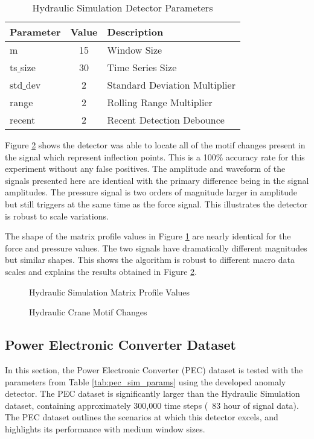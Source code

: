 \begin{table}[H]
\caption{Hydraulic Simulation Detector Parameters}
\begin{tabular}{|l|c|l|}
    \hline
	\textbf{Parameter} & \textbf{Value} & \textbf{Description} \\ \hline
	m & 15 & Window Size \\ \hline
	ts$\_$size & 30 & Time Series Size \\ \hline
	std$\_$dev & 2 & Standard Deviation Multiplier \\ \hline
	range & 2 & Rolling Range Multiplier\\ \hline
	recent & 2 & Recent Detection Debounce\\ \hline
\end{tabular}
\label{tab:hydraulic_sim_params}
\end{table}

Figure \ref{fig:hydraulic_result_fp} shows the detector was able to locate all of the motif changes present in the signal which represent inflection points.
This is a 100\% accuracy rate for this experiment without any false positives.
The amplitude and waveform of the signals presented here are identical with the primary difference being in the signal amplitudes.
The pressure signal is two orders of magnitude larger in amplitude but still triggers at the same time as the force signal.
This illustrates the detector is robust to scale variations.

The shape of the matrix profile values in Figure \ref{fig:hydraulic_mp_hist_fp} are nearly identical for the force and pressure values.
The two signals have dramatically different magnitudes but similar shapes.
This shows the algorithm is robust to different macro data scales and explains the results obtained in Figure \ref{fig:hydraulic_result_fp}.

\begin{figure}[H]
    
    \caption{Hydraulic Simulation Matrix Profile Values}
    \label{fig:hydraulic_mp_hist_fp}
\end{figure}

\begin{figure}[H]
    
    \caption{Hydraulic Crane Motif Changes}
    \label{fig:hydraulic_result_fp}
\end{figure}

\subsection{Power Electronic Converter Dataset}
\label{ref_results_pec_sim}
In this section, the Power Electronic Converter (PEC) dataset is tested with the parameters from Table \ref{tab:pec_sim_params} using the developed anomaly detector.
The PEC dataset is significantly larger than the Hydraulic Simulation dataset, containing approximately 300,000 time steps (~83 hour of signal data).
The PEC dataset outlines the scenarios at which this detector excels, and highlights its performance with medium window sizes.

